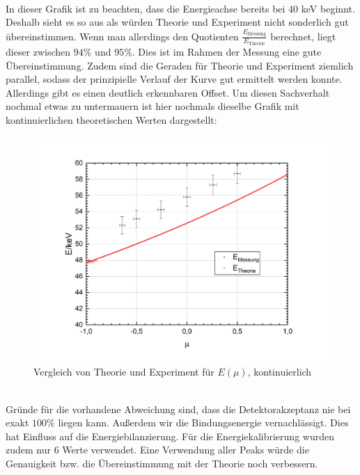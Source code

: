 \documentclass[german,  %
parskip=full,  %
]{scrartcl}
\begin{document}
\\
In dieser Grafik ist zu beachten, dass die Energieachse bereits bei $40$ keV beginnt. Deshalb sieht es so aus als würden Theorie und Experiment nicht sonderlich gut übereinstimmen. Wenn man allerdings den Quotienten $\frac{E_{\text{Messung}}}{E_{\text{Theorie}}}$ berechnet, liegt dieser zwischen $94$\% und $95$\%. Dies ist im Rahmen der Messung eine gute Übereinstimmung. Zudem sind die Geraden für Theorie und Experiment ziemlich parallel, sodass der prinzipielle Verlauf der Kurve gut ermittelt werden konnte. Allerdings gibt es einen deutlich erkennbaren Offset. Um diesen Sachverhalt nochmal etwas zu untermauern ist hier nochmals dieselbe Grafik mit kontinuierlichen theoretischen Werten dargestellt:
\\
\begin{figure}[h!]\centering
\includegraphics[scale=0.5]{vglexptheorie2}
\caption{Vergleich von Theorie und Experiment für $E (\mu)$, kontinuierlich}
\end{figure}
\\
Gründe für die vorhandene Abweichung sind, dass die Detektorakzeptanz nie bei exakt $100$\% liegen kann. Außerdem wir die Bindungsenergie vernachlässigt. Dies hat Einfluss auf die Energiebilanzierung. Für die Energiekalibrierung wurden zudem nur 6 Werte verwendet. Eine Verwendung aller Peaks würde die Genauigkeit bzw. die Übereinstimmung mit der Theorie noch verbessern.
\end{document}
